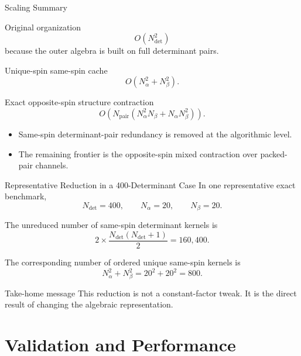 \documentclass{beamer}
\newcommand{\Dfull}{N_{\mathrm{det}}}
\newcommand{\Na}{N_{\alpha}}
\newcommand{\Nb}{N_{\beta}}
\newcommand{\Npair}{N_{\mathrm{pair}}}
\begin{document}
\begin{frame}{Scaling Summary}
  \begin{block}{Original organization}
    \[
    O(\Dfull^2)
    \]
    because the outer algebra is built on full determinant pairs.
  \end{block}

  \begin{block}{Unique-spin same-spin cache}
    \[
    O(\Na^2 + \Nb^2).
    \]
  \end{block}

  \begin{block}{Exact opposite-spin structure contraction}
    \[
    O\!\left(
      \Npair \left(\Na^2\Nb + \Na\Nb^2\right)
    \right).
    \]
  \end{block}

  \begin{itemize}
    \item Same-spin determinant-pair redundancy is removed at the algorithmic
          level.
    \item The remaining frontier is the opposite-spin mixed contraction over
          packed-pair channels.
  \end{itemize}
\end{frame}

\begin{frame}{Representative Reduction in a 400-Determinant Case}
  In one representative exact benchmark,
  \[
  \Dfull = 400,\qquad \Na = 20,\qquad \Nb = 20.
  \]

  The unreduced number of same-spin determinant kernels is
  \[
  2\times \frac{\Dfull(\Dfull+1)}{2}
  =
  160{,}400.
  \]

  The corresponding number of ordered unique same-spin kernels is
  \[
  \Na^2 + \Nb^2
  =
  20^2 + 20^2
  =
  800.
  \]

  \begin{block}{Take-home message}
    This reduction is not a constant-factor tweak. It is the direct result of
    changing the algebraic representation.
  \end{block}
\end{frame}

\section{Validation and Performance}
\end{document}
